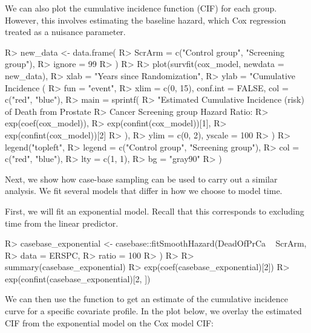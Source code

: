 \documentclass[
]{jss}
\begin{document}
We can also plot the cumulative incidence function (CIF) for each group.
However, this involves estimating the baseline hazard, which Cox
regression treated as a nuisance parameter.

\begin{CodeChunk}

\begin{CodeInput}
R> new_data <- data.frame(
R>   ScrArm = c("Control group", "Screening group"),
R>   ignore = 99
R> )
R> 
R> plot(survfit(cox_model, newdata = new_data),
R>   xlab = "Years since Randomization",
R>   ylab = "Cumulative Incidence (%
R>   fun = "event",
R>   xlim = c(0, 15), conf.int = FALSE, col = c("red", "blue"),
R>   main = sprintf(
R>     "Estimated Cumulative Incidence (risk) of Death from Prostate 
R>                     Cancer Screening group Hazard Ratio: %
R>     exp(coef(cox_model)),
R>     exp(confint(cox_model))[1],
R>     exp(confint(cox_model))[2]
R>   ),
R>   ylim = c(0, 2), yscale = 100
R> )
R> legend("topleft",
R>   legend = c("Control group", "Screening group"),
R>   col = c("red", "blue"),
R>   lty = c(1, 1),
R>   bg = "gray90"
R> )
\end{CodeInput}
\end{CodeChunk}

Next, we show how case-base sampling can be used to carry out a similar
analysis. We fit several models that differ in how we choose to model
time.

First, we will fit an exponential model. Recall that this corresponds to
excluding time from the linear predictor.

\begin{CodeChunk}

\begin{CodeInput}
R> casebase_exponential <- casebase::fitSmoothHazard(DeadOfPrCa ~ ScrArm,
R>   data = ERSPC,
R>   ratio = 100
R> )
R> 
R> summary(casebase_exponential)
R> exp(coef(casebase_exponential)[2])
R> exp(confint(casebase_exponential)[2, ])
\end{CodeInput}
\end{CodeChunk}

We can then use the  function to get an estimate of
the cumulative incidence curve for a specific covariate profile. In the
plot below, we overlay the estimated CIF from the exponential model on
the Cox model CIF:
\end{document}
